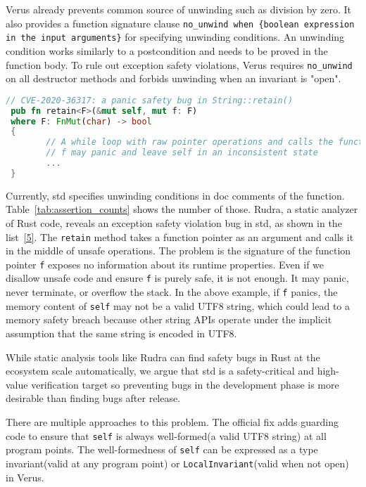 \documentclass[conference]{IEEEtran}
\begin{document}
Verus already prevents common source of unwinding such as division by zero. It also provides a function signature clause \texttt{no\_unwind when \{boolean expression in the input arguments\}} for specifying unwinding conditions. An unwinding condition works similarly to a postcondition and needs to be proved in the function body. To rule out exception safety violations, Verus requires \texttt{no\_unwind} on all destructor methods and forbids unwinding when an invariant is "open".  

\begin{lstlisting}[language=Rust,style=colouredRust, caption={An example of exception safety violation}, label = {5}]
// CVE-2020-36317: a panic safety bug in String::retain()
 pub fn retain<F>(&mut self, mut f: F)
 where F: FnMut(char) -> bool
 {
        // A while loop with raw pointer operations and calls the function f
        // f may panic and leave self in an inconsistent state
        ...
 }
\end{lstlisting}

Currently, std specifies unwinding conditions in doc comments of the function. Table~\ref{tab:assertion_counts} shows the number of those. Rudra\cite{Rudra}, a static analyzer of Rust code, reveals an exception safety violation bug\cite{CVE-2020-36317} in std, as shown in the list~\ref{5}. The \texttt{retain} method takes a function pointer as an argument and calls it in the middle of unsafe operations. The problem is the signature of the function pointer \texttt{f} exposes no information about its runtime properties. Even if we disallow unsafe code and ensure \texttt{f} is purely safe, it is not enough. It may panic, never terminate, or overflow the stack. In the above example, if \texttt{f} panics, the memory content of \texttt{self} may not be a valid UTF8 string, which could lead to a memory safety breach because other string APIs operate under the implicit assumption that the same string is encoded in UTF8.  

While static analysis tools like Rudra can find safety bugs in Rust at the ecosystem scale automatically, we argue that std is a safety-critical and high-value verification target so preventing bugs in the development phase is more desirable than finding bugs after release. 

There are multiple approaches to this problem. The official fix adds guarding code to ensure that \texttt{self} is always well-formed(a valid UTF8 string) at all program points. The well-formedness of \texttt{self} can be expressed as a type invariant(valid at any program point) or \texttt{LocalInvariant}(valid when not open) in Verus. 
\end{document}
